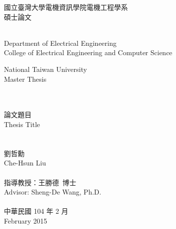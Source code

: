 \begin{titlepage}
  \begin{center}

    {\fontsize{18}{27}\selectfont
    國立臺灣大學電機資訊學院電機工程學系\\
    碩士論文\\
    }

    \small{~}\\

    {\fontsize{14}{21}\selectfont
    Department of Electrical Engineering\\
    College of Electrical Engineering and Computer Science\\
    }

    {\fontsize{16}{24}\selectfont
    National Taiwan University\\
    Master Thesis\\
    }

    {\fontsize{18}{27}\selectfont
    ~\\
    ~\\

    論文題目\\
    Thesis Title\\

    ~\\
    ~\\

    劉哲勳\\
    Che-Hsun Liu\\

    ~\\

    指導教授：王勝德~博士\\
    Advisor: Sheng-De Wang, Ph.D.\\

    ~\\

    中華民國 104 年 2 月\\
    February 2015\\
    }

  \end{center}
\end{titlepage}
